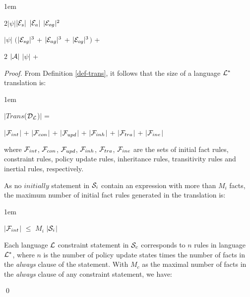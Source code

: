 \documentclass[global,twocolumn,final]{svjour}
\newenvironment{vtheorem}[1]
  {\begin{theorem}[#1]\hspace{0.25em}}
  {\end{theorem}}
\newenvironment{vproof}
  {\begin{proof}\hspace{0.25em}}
  {\qed\end{proof}}
\newenvironment{vquote}
  {\begin{list}{}{\leftmargin 1em}\item[]}
  {\end{list}}
\begin{document}
\begin{vtheorem}{Translation Size}
\begin{vquote}
            \hspace{1em}
            $2|\psi|$$|{\cal E}_{s}|$ $|{\cal E}_{a}|$ $|{\cal E}_{og}|^{2}$

            \hspace{1em}
            $|\psi|$ $($$|{\cal E}_{sg}|^{3}$ +
            $|{\cal E}_{ag}|^{3}$ +
            $|{\cal E}_{og}|^{3}$$)$ +

            \hspace{1em}
            $2$ $|{\cal A}|$ $|\psi|$ +
          \end{vquote}
        \end{vtheorem}

        \begin{vproof}
          From Definition \ref{def-trans}, it follows that the size of a
          language ${\cal L}^{*}$ translation is:

          \begin{vquote}
            $|$$Trans$(${\cal D_{L}}$)$|$ =

            \hspace{1em}
            $|$${\cal F}_{int}$$|$ +
            $|$${\cal F}_{con}$$|$ +
            $|$${\cal F}_{upd}$$|$ +
            $|$${\cal F}_{inh}$$|$ +
            $|$${\cal F}_{tra}$$|$ +
            $|$${\cal F}_{ine}$$|$
          \end{vquote}

          where ${\cal F}_{int}$, ${\cal F}_{con}$, ${\cal F}_{upd}$,
          ${\cal F}_{inh}$, ${\cal F}_{tra}$, ${\cal F}_{ine}$ are the sets of
          initial fact rules, constraint rules, policy update rules,
          inheritance rules, transitivity rules and inertial rules,
          respectively.

          As no $initially$ statement in ${\cal S}_{i}$ contain an expression
          with more than $M_{i}$ facts, the maximum number of initial fact
          rules generated in the translation is:

          \begin{vquote}
            $|$${\cal F}_{int}$$|$ $\leq$ $M_{i}$ $|$${\cal S}_{i}$$|$
          \end{vquote}

          Each language ${\cal L}$ constraint statement in ${\cal S}_{c}$
          corresponds to $n$ rules in language ${\cal L}^{*}$, where $n$ is
          the number of policy update states times the number of facts in the
          {\em always} clause of the statement. With $M_{c}$ as the maximal
          number of facts in the {\em always} clause of any constraint
          statement, we have:


\end{vproof}
\end{document}
